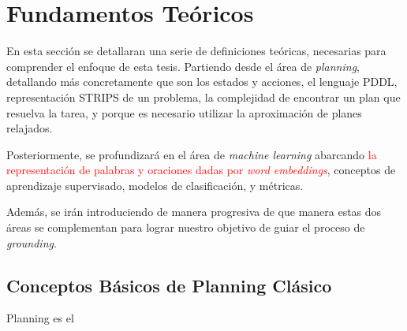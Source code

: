 \chapter{Fundamentos Teóricos}
\label{ch:lit_rev} %

En esta sección se detallaran una serie de definiciones teóricas, necesarias para comprender el enfoque de esta tesis. Partiendo desde el área de \emph{planning}, detallando más concretamente que son los estados y acciones, el lenguaje PDDL, representación STRIPS de un problema, la complejidad de encontrar un plan que resuelva la tarea, y porque es necesario utilizar la aproximación de planes relajados.

Posteriormente, se profundizará en el área de \emph{machine learning} abarcando \textcolor{red}{la representación de palabras y oraciones dadas por \emph{word embeddings}}, conceptos de aprendizaje supervisado, modelos de clasificación, y métricas.

Además, se irán introduciendo de manera progresiva de que manera estas dos áreas se complementan para lograr nuestro objetivo de guiar el proceso de \emph{grounding}.

\section{Conceptos Básicos de Planning Clásico}
Planning es el 